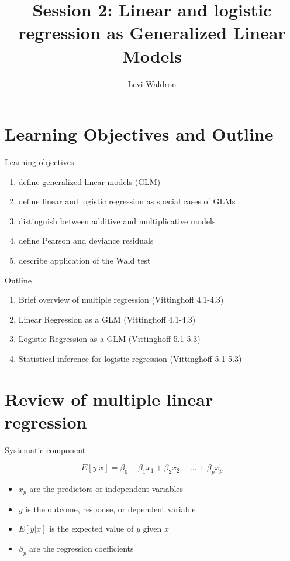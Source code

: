 \documentclass[
  ignorenonframetext,
]{beamer}
\title{Session 2: Linear and logistic regression as Generalized Linear Models}
\author{Levi Waldron}
\date{}
\institute{CUNY SPH Biostatistics 2}
\providecommand{\tightlist}{%
  \setlength{\itemsep}{0pt}\setlength{\parskip}{0pt}}
\begin{document}
\frame{\titlepage}

\hypertarget{learning-objectives-and-outline}{%
\section{Learning Objectives and
Outline}\label{learning-objectives-and-outline}}

\begin{frame}{Learning objectives}
\protect\hypertarget{learning-objectives}{}

\begin{enumerate}
\tightlist
\item
  define generalized linear models (GLM)
\item
  define linear and logistic regression as special cases of GLMs
\item
  distinguish between additive and multiplicative models
\item
  define Pearson and deviance residuals
\item
  describe application of the Wald test
\end{enumerate}

\end{frame}

\begin{frame}{Outline}
\protect\hypertarget{outline}{}

\begin{enumerate}
\tightlist
\item
  Brief overview of multiple regression (Vittinghoff 4.1-4.3)
\item
  Linear Regression as a GLM (Vittinghoff 4.1-4.3)
\item
  Logistic Regression as a GLM (Vittinghoff 5.1-5.3)
\item
  Statistical inference for logistic regression (Vittinghoff 5.1-5.3)
\end{enumerate}

\end{frame}

\hypertarget{review-of-multiple-linear-regression}{%
\section{Review of multiple linear
regression}\label{review-of-multiple-linear-regression}}

\begin{frame}{Systematic component}
\protect\hypertarget{systematic-component}{}

\[
E[y|x] = \beta_0 + \beta_1 x_1 + \beta_2 x_2 + ... + \beta_p x_p
\]

\begin{itemize}
\tightlist
\item
  \(x_p\) are the predictors or independent variables
\item
  \(y\) is the outcome, response, or dependent variable
\item
  \(E[y|x]\) is the expected value of \(y\) given \(x\)
\item
  \(\beta_p\) are the regression coefficients
\end{itemize}

\end{frame}
\end{document}
